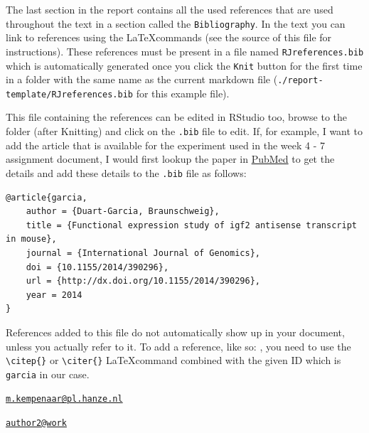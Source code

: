 The last section in the report contains all the used references that are
used throughout the text in a section called the \texttt{Bibliography}.
In the text you can link to references using the \LaTeX commands (see
the source of this file for instructions). These references must be
present in a file named \texttt{RJreferences.bib} which is automatically
generated once you click the \texttt{Knit} button for the first time in
a folder with the same name as the current markdown file
(\texttt{./report-template/RJreferences.bib} for this example file).

This file containing the references can be edited in RStudio too, browse
to the folder (after Knitting) and click on the \texttt{.bib} file to
edit. If, for example, I want to add the article that is available for
the experiment used in the week 4 - 7 assignment document, I would first
lookup the paper in
\href{http://www.ncbi.nlm.nih.gov/pmc/articles/PMC3914337/}{PubMed} to
get the details and add these details to the \texttt{.bib} file as
follows:

\begin{verbatim}
@article{garcia,
    author = {Duart-Garcia, Braunschweig},
    title = {Functional expression study of igf2 antisense transcript in mouse},
    journal = {International Journal of Genomics},
    doi = {10.1155/2014/390296},
    url = {http://dx.doi.org/10.1155/2014/390296},
    year = 2014
}
\end{verbatim}

References added to this file do not automatically show up in your
document, unless you actually refer to it. To add a reference, like so:
\citep{garcia:2014}, you need to use the
\texttt{\textbackslash{}citep\{\}} or \texttt{\textbackslash{}citer\{\}}
\LaTeX command combined with the given ID which is \texttt{garcia} in
our case.



\address{%
Marcel Kempenaar\\
Hanze University of Applied Sciences\\
Zernikeplein 11\\ room D1.12\\
}
\href{mailto:m.kempenaar@pl.hanze.nl}{\nolinkurl{m.kempenaar@pl.hanze.nl}}

\address{%
Author Two\\
Affiliation\\
line 1\\ line 2\\
}
\href{mailto:author2@work}{\nolinkurl{author2@work}}

